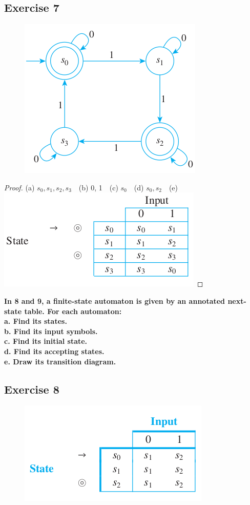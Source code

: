 \documentclass[14pt]{extarticle}
\newcommand{\cy}{\color{cyan}}
\begin{document}
\subsection{Exercise 7}
\begin{figure}[ht!]
\centering
\includegraphics[scale=0.5]{../images/12.2.7.png}
\end{figure}

\begin{proof}
(a) \(s_0, s_1, s_2, s_3\) \,\, (b) 0, 1 \,\, (c) \(s_0\) \,\, 
(d) \(s_0, s_2\) \,\, (e)
\includegraphics[scale=0.5]{../images/12.2.7.e.png}
\end{proof}

{\bf \cy In 8 and 9, a finite-state automaton is given by an annotated next-state table. For each automaton: \\
a. Find its states. \\
b. Find its input symbols. \\
c. Find its initial state. \\
d. Find its accepting states. \\
e. Draw its transition diagram.}

\subsection{Exercise 8}
\begin{figure}[ht!]
\centering
\includegraphics[scale=0.5]{../images/12.2.8.png}
\end{figure}
\end{document}
